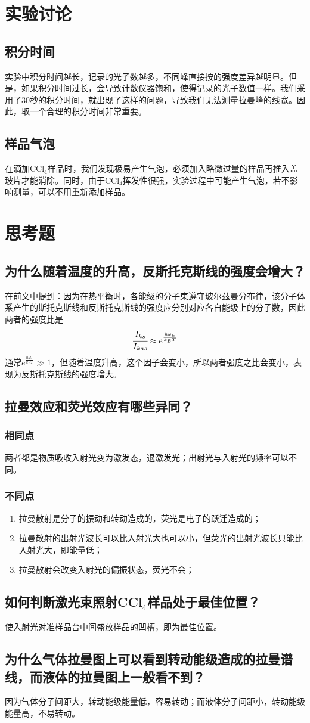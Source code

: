 \documentclass[a4paper]{article}
\begin{document}
\section{实验讨论}
\subsection{积分时间}
实验中积分时间越长，记录的光子数越多，不同峰直接按的强度差异越明显。但是，如果积分时间过长，会导致计数仪器饱和，使得记录的光子数值一样。我们采用了30秒的积分时间，就出现了这样的问题，导致我们无法测量拉曼峰的线宽。因此，取一个合理的积分时间非常重要。
\subsection{样品气泡}
在滴加CCl$_4$样品时，我们发现极易产生气泡，必须加入略微过量的样品再推入盖玻片才能消除。同时，由于CCl$_4$挥发性很强，实验过程中可能产生气泡，若不影响测量，可以不用重新添加样品。

\section{思考题}
\subsection{为什么随着温度的升高，反斯托克斯线的强度会增大？}
在前文中提到：因为在热平衡时，各能级的分子束遵守玻尔兹曼分布律，该分子体系产生的斯托克斯线和反斯托克斯线的强度应分别对应各自能级上的分子数，因此两者的强度比是
\begin{equation}
\cfrac{I_{ks}}{I_{kas}} \approx e^{\frac{\hbar\omega_k}{k_BT}}\label{eq7}
\end{equation}
通常$e^{\frac{\hbar\omega_k}{k_BT}}\gg 1$，但随着温度升高，这个因子会变小，所以两者强度之比会变小，表现为反斯托克斯线的强度增大。
\subsection{拉曼效应和荧光效应有哪些异同？}
\subsubsection{相同点}
两者都是物质吸收入射光变为激发态，退激发光；出射光与入射光的频率可以不同。
\subsubsection{不同点}
\begin{enumerate}
\item 拉曼散射是分子的振动和转动造成的，荧光是电子的跃迁造成的；
\item 拉曼散射的出射光波长可以比入射光大也可以小，但荧光的出射光波长只能比入射光大，即能量低；
\item 拉曼散射会改变入射光的偏振状态，荧光不会；
\end{enumerate}
\subsection{如何判断激光束照射CCl$_4$样品处于最佳位置？}
使入射光对准样品台中间盛放样品的凹槽，即为最佳位置。
\subsection{为什么气体拉曼图上可以看到转动能级造成的拉曼谱线，而液体的拉曼图上一般看不到？}
因为气体分子间距大，转动能级能量低，容易转动；而液体分子间距小，转动能级能量高，不易转动。

\nocite{jiaocai}

\end{document}
